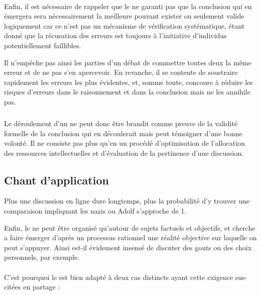 \paragraph{}
Enfin, il est nécessaire de rappeler que le \mainabbr{} ne garanti pas que la conclusion qui en émergera sera nécessairement la meilleure pouvant exister ou seulement valide logiquement car ce n’est pas un mécanisme de vérification systématique, étant donné que la récusation des erreurs est toujours à l’initiative d’individus potentiellement faillibles.

Il n’empêche pas ainsi les parties d’un débat de commettre toutes deux la même erreur et de ne pas s’en apercevoir. En revanche, il se contente de soustraire rapidement les erreurs les plus évidentes, et, somme toute, concoure à réduire les risques d’erreurs dans le raisonnement et dans la conclusion mais ne les annihile pas.

\subparagraph{}
Le déroulement d’un \mainabbr{} ne peut donc être brandit comme preuve de la validité formelle de la conclusion qui en découlerait mais peut témoigner d’une bonne volonté. Il ne consiste pas plus qu’en un procédé d’optimisation de l’allocation des ressources intellectuelles et d’évaluation de la pertinence d’une discussion.

\subsection{Chant d’application}
\epigraph{Plus une discussion en ligne dure longtemps, plus la probabilité d’y trouver une comparaison impliquant les nazis ou Adolf  s’approche de 1.}{}
Enfin, le \mainabbr{} ne peut être organisé qu’autour de sujets factuels et objectifs, et cherche a faire émerger d’après un processus rationnel une réalité objective sur laquelle on peut s’appuyer. Ainsi est-il évidement insensé de discuter des gouts ou des choix personnels, par exemple.

\paragraph*{}
C’est pourquoi le \mainabbr{} est bien adapté à deux cas distincts ayant cette exigence sus-citées en partage :


